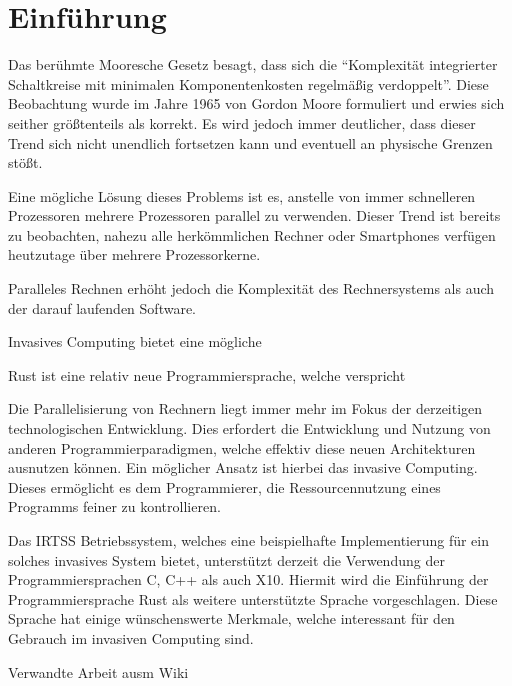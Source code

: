 \chapter{Einführung}\label{sec:intro}

Das berühmte Mooresche Gesetz besagt, dass sich die 
``Komplexität integrierter Schaltkreise mit minimalen Komponentenkosten regelmäßig verdoppelt''\cite{mooresLawWikiDe}.
Diese Beobachtung wurde im Jahre 1965 von Gordon Moore formuliert und erwies sich seither größtenteils als korrekt.
Es wird jedoch immer deutlicher, dass dieser Trend sich nicht unendlich fortsetzen kann und eventuell an physische Grenzen stößt.

Eine mögliche Lösung dieses Problems ist es, anstelle von immer schnelleren Prozessoren mehrere Prozessoren parallel zu verwenden.
Dieser Trend ist bereits zu beobachten, nahezu alle herkömmlichen Rechner oder Smartphones verfügen heutzutage über
mehrere Prozessorkerne.

Paralleles Rechnen erhöht jedoch die Komplexität des Rechnersystems als auch der darauf laufenden Software.

Invasives Computing bietet eine mögliche  



Rust ist eine relativ neue Programmiersprache, welche verspricht 



Die Parallelisierung von Rechnern liegt immer mehr im Fokus der derzeitigen technologischen Entwicklung.
Dies erfordert die Entwicklung und Nutzung von anderen Programmierparadigmen, welche effektiv
diese neuen Architekturen ausnutzen können. Ein möglicher Ansatz ist hierbei das
invasive Computing. Dieses ermöglicht es dem Programmierer, die Ressourcennutzung
eines Programms feiner zu kontrollieren.

Das IRTSS Betriebssystem, welches eine beispielhafte Implementierung für ein solches
invasives System bietet, unterstützt derzeit die Verwendung der Programmiersprachen
C, C++ als auch X10. Hiermit wird die Einführung der Programmiersprache Rust als
weitere unterstützte Sprache vorgeschlagen. Diese Sprache hat einige wünschenswerte Merkmale, 
welche interessant für den Gebrauch im invasiven Computing sind.

Verwandte Arbeit ausm Wiki